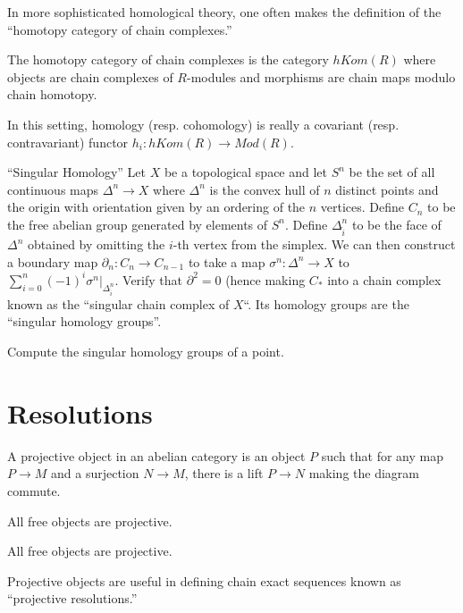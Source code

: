 In more sophisticated homological theory, one often makes the
definition of the ``homotopy category of chain complexes.''
\begin{definition} The homotopy category of chain complexes is
the category $hKom(R)$ where objects are chain complexes of
$R$-modules and morphisms are chain maps modulo chain homotopy.
\end{definition}

In this setting, homology (resp. cohomology) is really a
covariant (resp. contravariant) functor $h_i:hKom(R)\rightarrow
Mod(R)$.

\begin{exercise} ``Singular Homology'' Let $X$ be a topological
space and let $S^n$ be the set of all continuous maps
$\Delta^n\rightarrow X$ where $\Delta^n$ is the convex hull of
$n$ distinct points and the origin with orientation given by an
ordering of the $n$ vertices. Define $C_n$ to be the free
abelian group generated by elements of $S^n$. Define
$\Delta^n_{\hat{i}}$ to be the face of $\Delta^n$ obtained by
omitting the $i$-th vertex from the simplex. We can then
construct a boundary map $\partial_n:C_n\rightarrow C_{n-1}$ to
take a map $\sigma^n:\Delta^n\rightarrow X$ to
$\sum_{i=0}^n(-1)^i\sigma^n|_{\Delta^n_{\hat{i}}}$. Verify that
$\partial^2=0$ (hence making $C_*$ into a chain complex known as
the ``singular chain complex of $X$``. Its homology groups are
the ``singular homology groups''. \end{exercise}
\begin{exercise} Compute the singular homology groups of a
point. \end{exercise}

\section{Resolutions}
\begin{definition} A projective object in an abelian category is
an object $P$
such that for any map $P\rightarrow M$ and a surjection
$N\rightarrow M$, there
is a lift $P\rightarrow N$ making the diagram commute.
\end{definition}
\begin{example} All free objects are projective. \end{example}

\begin{example} All free objects are projective. \end{example}
Projective objects are useful in defining chain exact sequences
known as ``projective resolutions.''

